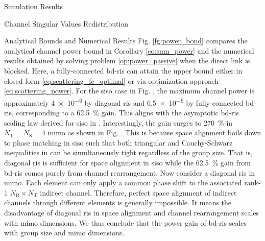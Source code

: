 \documentclass[journal]{IEEEtran}
\begin{document}
\begin{section}{Simulation Results}
\begin{subsection}{Channel Singular Values Redistribution}
\begin{subsubsection}{Analytical Bounds and Numerical Results}
			Fig. \ref{fg:power_bond} compares the analytical channel power bound in Corollary \ref{co:sum_power} and the numerical results obtained by solving problem \eqref{op:power_passive} when the direct link is blocked.
			Here, a fully-connected \gls{bd}-\gls{ris} can attain the upper bound either in closed form \eqref{eq:scattering_fc_optimal} or via optimization approach \eqref{eq:scattering_power}.
			For the \gls{siso} case in Fig. , the maximum channel power is approximately \num{4e-6} by diagonal \gls{ris} and \num{6.5e-6} by fully-connected \gls{bd}-\gls{ris}, corresponding to a \qty{62.5}{\percent} gain.
			This aligns with the asymptotic \gls{bd}-\gls{ris} scaling law derived for \gls{siso} in \cite{Shen2020a}.
			Interestingly, the gain surges to \qty{270}{\percent} in $N_\mathrm{T}=N_\mathrm{S}=4$ \gls{mimo} as shown in Fig. .
			This is because space alignment boils down to phase matching in \gls{siso} such that both triangular and Cauchy-Schwarz inequalities in \cite[(50)]{Shen2020a} can be simultaneously tight regardless of the group size.
			That is, diagonal \gls{ris} is sufficient for space alignment in \gls{siso} while the \qty{62.5}{\percent} gain from \gls{bd}-\gls{ris} comes purely from channel rearrangement.
			Now consider a diagonal \gls{ris} in \gls{mimo}.
			Each element can only apply a common phase shift to the associated rank-1 $N_\mathrm{R} \times N_\mathrm{T}$ indirect channel.
			Therefore, perfect space alignment of indirect channels through different elements is generally impossible.
			It means the disadvantage of diagonal \gls{ris} in space alignment and channel rearrangement scales with \gls{mimo} dimensions.
			We thus conclude that the power gain of \gls{bd}-\gls{ris} scales with group size and \gls{mimo} dimensions.
		\end{subsubsection}


\end{subsection}
\end{section}
\end{document}
